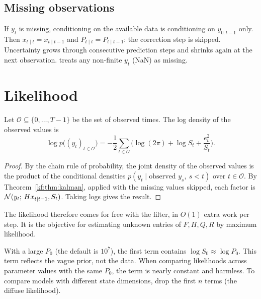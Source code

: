 \subsection{Missing observations}
If $y_t$ is missing, conditioning on the available data is conditioning on
$y_{0:t-1}$ only. Then $x_{t\mid t}=x_{t\mid t-1}$ and $P_{t\mid t}=P_{t\mid t-1}$: the
correction step is skipped. Uncertainty grows through consecutive prediction steps
and shrinks again at the next observation.  treats any non-finite
$y_t$ (NaN) as missing.

\section{Likelihood}

\begin{proposition}\label{kf:prop:likelihood}
Let $\mathcal O\subseteq\{0,\dots,T-1\}$ be the set of observed times. The log
density of the observed values is
\[
  \log p\big((y_t)_{t\in\mathcal O}\big) = -\frac12\sum_{t\in\mathcal O}\Big(\log(2\pi) + \log S_t + \frac{e_t^2}{S_t}\Big).
\]
\end{proposition}
\begin{proof}
By the chain rule of probability, the joint density of the observed values is the product of
the conditional densities $p(y_t\mid \text{observed }y_s,\ s<t)$ over
$t\in\mathcal O$. By Theorem~\ref{kf:thm:kalman}, applied with the missing values
skipped, each factor is $\mathcal{N}(y_t;\,Hx_{t\mid t-1},S_t)$. Taking logs gives the result.
\end{proof}

The likelihood therefore comes for free with the filter, in $O(1)$ extra work
per step. It is the objective for estimating unknown entries of $F,H,Q,R$ by
maximum likelihood.

\begin{remark}
With a large $P_0$ (the  default is $10^7$), the first term contains
$\log S_0\approx\log P_0$. This term reflects the vague prior, not the
data. When comparing likelihoods across parameter values with the same $P_0$,
the term is nearly constant and harmless. To compare models with
different state dimensions, drop the first $n$ terms (the diffuse
likelihood).
\end{remark}

